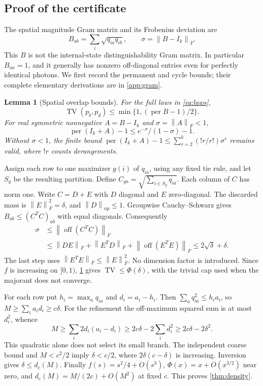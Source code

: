 \documentclass[11pt,a4paper]{article}
\newtheorem{lemma}[theorem]{Lemma}
\theoremstyle{remark}\newtheorem{remark}[theorem]{Remark}
\DeclareMathOperator{\TV}{TV}
\DeclareMathOperator{\per}{per}
\DeclareMathOperator{\off}{off}
\newcommand{\norm}[1]{\left\lVert#1\right\rVert}
\begin{document}
\subsection{Proof of the certificate}
The spatial magnitude Gram matrix and its Frobenius deviation are
\begin{equation}
 B_{ab}=\sum_i\sqrt{q_{ia}q_{ib}},\qquad \sigma=\norm{B-I_k}_F.\label{eq:gram}
\end{equation}
This $B$ is not the internal-state distinguishability Gram matrix. In particular $B_{aa}=1$, and it generally has nonzero off-diagonal entries even for perfectly identical photons. We first record the permanent and cycle bounds; their complete elementary derivations are in \cref{app:gram}.
\begin{lemma}[Spatial overlap bounds]\label{lem:gram}
For the full laws in \cref{eq:laws},
\begin{equation}
 \TV(p_b,p_d)\le\min\{1,(\per B-1)/2\}.
\end{equation}
For real symmetric nonnegative $A=B-I_k$ and $\sigma=\norm A_F<1$,
\begin{equation}
 \per(I_k+A)-1\le e^{-\sigma}/(1-\sigma)-1.
\end{equation}
Without $\sigma<1$, the finite bound $\per(I_k+A)-1\le\sum_{r=2}^k(!r/r!)\sigma^r$ remains valid, where $!r$ counts derangements.
\end{lemma}

Assign each row to one maximizer $g(i)$ of $q_{ia}$, using any fixed tie rule, and let $S_g$ be the resulting partition. Define $C_{ga}=\sqrt{\sum_{i\in S_g}q_{ia}}$. Each column of $C$ has norm one. Write $C=D+E$ with $D$ diagonal and $E$ zero-diagonal. The discarded mass is $\norm E_F^2=\delta$, and $\norm D_{\mathrm{op}}\le1$. Groupwise Cauchy--Schwarz gives $B_{ab}\le(C^TC)_{ab}$ with equal diagonals. Consequently
\begin{align}
 \sigma&\le\norm{\off(C^TC)}_F\nonumber\\
 &\le\norm{DE}_F+\norm{E^TD}_F+\norm{\off(E^TE)}_F
 \le2\sqrt\delta+\delta.\label{eq:support}
\end{align}
The last step uses $\norm{E^TE}_F\le\norm E_F^2$. No dimension factor is introduced. Since $f$ is increasing on $[0,1)$, \cref{lem:gram} gives $\TV\le\Phi(\delta)$, with the trivial cap used when the majorant does not converge.

For each row put $h_i=\max_aq_{ia}$ and $d_i=a_i-h_i$. Then $\sum_aq_{ia}^2\le h_ia_i$, so $M\ge\sum_i a_id_i\ge c\delta$. For the refinement the off-maximum squared sum is at most $d_i^2$, whence
\begin{equation}
 M\ge\sum_i2d_i(a_i-d_i)\ge2c\delta-2\sum_i d_i^2
 \ge2c\delta-2\delta^2.\label{eq:quadratic}
\end{equation}
This quadratic alone does not select its small branch. The independent coarse bound and $M<c^2/2$ imply $\delta<c/2$, where $2\delta(c-\delta)$ is increasing. Inversion gives $\delta\le d_c(M)$. Finally $f(s)=s^2/4+O(s^3)$, $\Phi(x)=x+O(x^{3/2})$ near zero, and $d_c(M)=M/(2c)+O(M^2)$ at fixed $c$. This proves \cref{thm:density}.
\end{document}
